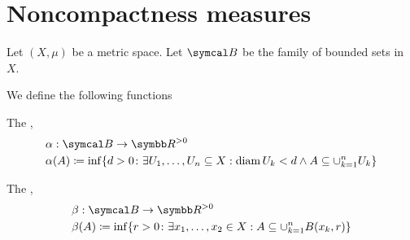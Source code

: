 \section{Noncompactness measures}\label{sec:noncompactness_measures}

Let \( (X, \mu) \) be a metric space. Let \( \Cal{B} \) be the family of bounded sets in \( X \).

\begin{definition}\label{def:noncompactness_measures}\cite[definition 7.1]{Deimling1985}
  We define the following functions
  \begin{defenum}
    \item\label{def:noncompactness_measures/sets} The ,
    \begin{align*}
      &\alpha: \Cal{B} \to \BB{R}^{>0} \\
      &\alpha(A) \coloneqq \inf \{d > 0 \colon \exists U_1, \ldots, U_n \subseteq X: \Diam {U_k} < d \land A \subseteq \cup_{k=1}^n U_k \}
    \end{align*}

    \item\label{def:noncompactness_measures/balls} The ,
    \begin{align*}
      &\beta: \Cal{B} \to \BB{R}^{>0} \\
      &\beta(A) \coloneqq \inf \{r > 0 \colon \exists x_1, \ldots, x_2 \in X: A \subseteq \cup_{k=1}^n B(x_k, r) \}
    \end{align*}
  \end{defenum}
\end{definition}

